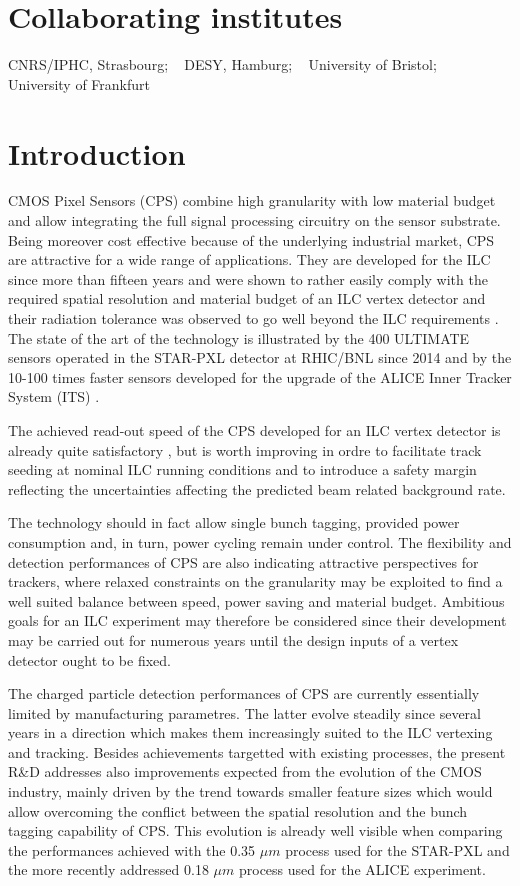 \documentclass[11pt,a4paper,twosided]{article}
\begin{document}
\section{Collaborating institutes}

CNRS/IPHC, Strasbourg; ~ DESY, Hamburg; ~ 
University of Bristol; ~ University of Frankfurt



\section{Introduction} 

   CMOS Pixel Sensors (CPS) combine high granularity with low material 
budget and allow integrating the full signal processing circuitry on 
the sensor substrate. Being moreover cost effective because of the 
underlying industrial market, CPS are attractive for a wide range of 
applications. They are developed for the ILC since more than fifteen 
years and were shown to rather easily comply with the required spatial 
resolution and material budget of an ILC vertex detector and their 
radiation tolerance was observed to go well beyond the ILC requirements \cite{ref:cps1}. The state of the art of the technology is illustrated 
by the 400 ULTIMATE sensors  operated in the STAR-PXL detector 
\cite{ref:cps2} at RHIC/BNL since 2014 and by the 10-100 times faster 
sensors developed for the upgrade of the ALICE Inner Tracker System 
(ITS) \cite{ref:cps3}.


  The achieved read-out speed of the CPS developed for an ILC 
vertex detector is already quite satisfactory \cite{ref:cps1}, 
but is worth 
improving in ordre to facilitate track seeding at nominal ILC 
running conditions and to introduce a safety margin reflecting the 
uncertainties affecting the predicted beam related background rate. 

The technology should in fact allow single bunch tagging, provided power 
consumption and, in turn, power cycling remain under control. The flexibility and detection performances of CPS are also indicating attractive perspectives for trackers, where relaxed constraints on the granularity may be exploited 
to find a well suited balance between speed, power saving and material budget. Ambitious goals for an ILC experiment may therefore be considered
since their development may be carried out for numerous years until the design
inputs of a vertex detector ought to be fixed.

The charged particle detection performances of CPS are 
currently essentially limited by manufacturing parametres. 
The latter evolve steadily since several years in a direction which makes 
them increasingly suited to the ILC vertexing and tracking. Besides 
achievements targetted with existing processes, the present R\&D 
addresses also improvements expected from the evolution of the CMOS 
industry, mainly driven by the trend towards smaller feature sizes which
would allow overcoming the conflict between the spatial resolution and the 
bunch tagging capability of CPS. This evolution is already well visible
when comparing the performances achieved with the 0.35 $\mu m$ process 
used for the STAR-PXL and the more recently addressed 0.18 $\mu m$ process 
used for the ALICE experiment.
\end{document}
